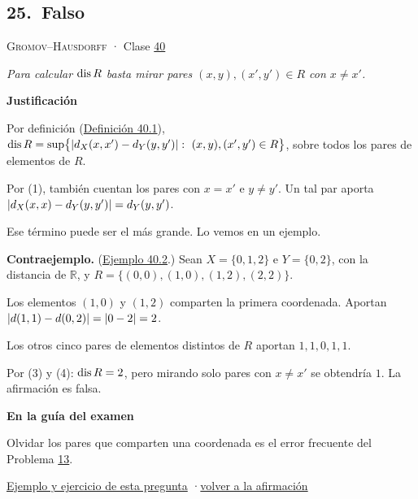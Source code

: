 \documentclass[11pt,a4paper]{article}
\newcommand{\R}{\mathbb{R}}\newcommand{\N}{\mathbb{N}}\newcommand{\Q}{\mathbb{Q}}
\newcommand{\bloque}[1]{\par\smallskip\noindent\textbf{\color{acento}#1}\par}
\begin{document}
\subsection*{\hypertarget{r-25}{}25.\ \textcolor{bad}{Falso}}
{\small \textsc{Gromov–Hausdorff} · Clase \href{https://decostruttivismo.github.io/MAT2514-repaso/pdf/MAT2514_apuntes_completos.pdf\#nameddest=section.40}{40}}\par
\emph{Para calcular $\operatorname{dis} R$ basta mirar pares $(x,y),(x',y')\in R$ con $x\ne x'$.}
\bloque{Justificación}
\begin{pasos}
\item[(1)] Por definición (\href{https://decostruttivismo.github.io/MAT2514-repaso/pdf/MAT2514_apuntes_completos.pdf\#nameddest=teorema.40.1}{Definición 40.1}), $\operatorname{dis} R=\sup\bigl\{\lvert d_X(x,x')-d_Y(y,y')\rvert:\ (x,y),(x',y')\in R\bigr\}$, sobre todos los pares de elementos de $R$.
\item[(2)] Por (1), también cuentan los pares con $x=x'$ e $y\ne y'$. Un tal par aporta $\lvert d_X(x,x)-d_Y(y,y')\rvert=d_Y(y,y')$.
\item[] Ese término puede ser el más grande. Lo vemos en un ejemplo.
\item[] \textbf{Contraejemplo.} (\href{https://decostruttivismo.github.io/MAT2514-repaso/pdf/MAT2514_apuntes_completos.pdf\#nameddest=teorema.40.2}{Ejemplo 40.2}.) Sean $X=\{0,1,2\}$ e $Y=\{0,2\}$, con la distancia de $\R$, y $R=\{(0,0),(1,0),(1,2),(2,2)\}$.
\item[(3)] Los elementos $(1,0)$ y $(1,2)$ comparten la primera coordenada. Aportan $\lvert d(1,1)-d(0,2)\rvert=\lvert 0-2\rvert=2$.
\item[(4)] Los otros cinco pares de elementos distintos de $R$ aportan $1,1,0,1,1$.
\item[] Por (3) y (4): $\operatorname{dis} R=2$, pero mirando solo pares con $x\ne x'$ se obtendría $1$. La afirmación es falsa.
\end{pasos}
\bloque{En la guía del examen}
\begin{pasos}
\item[] Olvidar los pares que comparten una coordenada es el error frecuente del Problema \hyperlink{prob-13}{13}.
\end{pasos}
\par{}
\par{\small \hyperlink{e-25}{Ejemplo y ejercicio de esta pregunta} \quad·\quad \hyperlink{q-25}{volver a la afirmación}}
\end{document}
